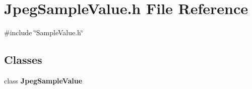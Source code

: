 \section{Jpeg\+Sample\+Value.\+h File Reference}
\label{JpegSampleValue_8h}
{\ttfamily \#include \char`\"{}Sample\+Value.\+h\char`\"{}}\newline
\subsection*{Classes}
\begin{DoxyCompactItemize}
\item 
class \textbf{ Jpeg\+Sample\+Value}
\end{DoxyCompactItemize}
